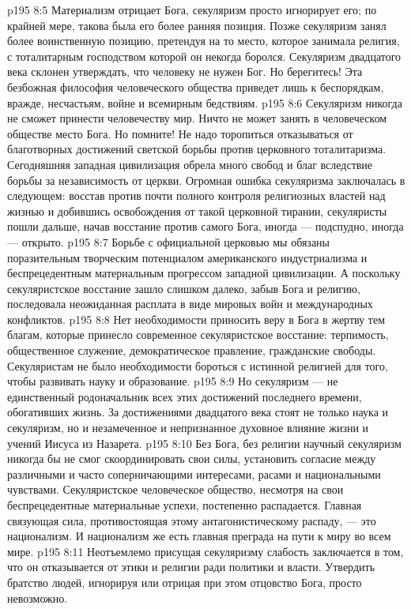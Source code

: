 \vs p195 8:5 \pc Материализм отрицает Бога, секуляризм просто игнорирует его; по крайней мере, такова была его более ранняя позиция. Позже секуляризм занял более воинственную позицию, претендуя на то место, которое занимала религия, с тоталитарным господством которой он некогда боролся. Секуляризм двадцатого века склонен утверждать, что человеку не нужен Бог. Но берегитесь! Эта безбожная философия человеческого общества приведет лишь к беспорядкам, вражде, несчастьям, войне и всемирным бедствиям.
\vs p195 8:6 \pc Секуляризм никогда не сможет принести человечеству мир. Ничто не может занять в человеческом обществе место Бога. Но помните! Не надо торопиться отказываться от благотворных достижений светской борьбы против церковного тоталитаризма. Сегодняшняя западная цивилизация обрела много свобод и благ вследствие борьбы за независимость от церкви. Огромная ошибка секуляризма заключалась в следующем: восстав против почти полного контроля религиозных властей над жизнью и добившись освобождения от такой церковной тирании, секуляристы пошли дальше, начав восстание против самого Бога, иногда --- подспудно, иногда --- открыто.
\vs p195 8:7 Борьбе с официальной церковью мы обязаны поразительным творческим потенциалом американского индустриализма и беспрецедентным материальным прогрессом западной цивилизации. А поскольку секуляристское восстание зашло слишком далеко, забыв Бога и  религию, последовала неожиданная расплата в виде мировых войн и международных конфликтов.
\vs p195 8:8 Нет необходимости приносить веру в Бога в жертву тем благам, которые принесло современное секуляристское восстание: терпимость, общественное служение, демократическое правление, гражданские свободы. Секуляристам не было необходимости бороться с истинной религией для того, чтобы развивать науку и образование.
\vs p195 8:9 Но секуляризм --- не единственный родоначальник всех этих достижений последнего времени, обогативших жизнь. За достижениями двадцатого века стоят не только наука и секуляризм, но и незамеченное и непризнанное духовное влияние жизни и учений Иисуса из Назарета.
\vs p195 8:10 Без Бога, без религии научный секуляризм никогда бы не смог скоординировать свои силы, установить согласие между различными и часто соперничающими интересами, расами и национальными чувствами. Секуляристское человеческое общество, несмотря на свои беспрецедентные материальные успехи, постепенно распадается. Главная связующая сила, противостоящая этому антагонистическому распаду, --- это национализм. И национализм же есть главная преграда на пути к миру во всем мире.
\vs p195 8:11 Неотъемлемо присущая секуляризму слабость заключается в том, что он отказывается от этики и религии ради политики и власти. Утвердить братство людей, игнорируя или отрицая при этом отцовство Бога, просто невозможно.
